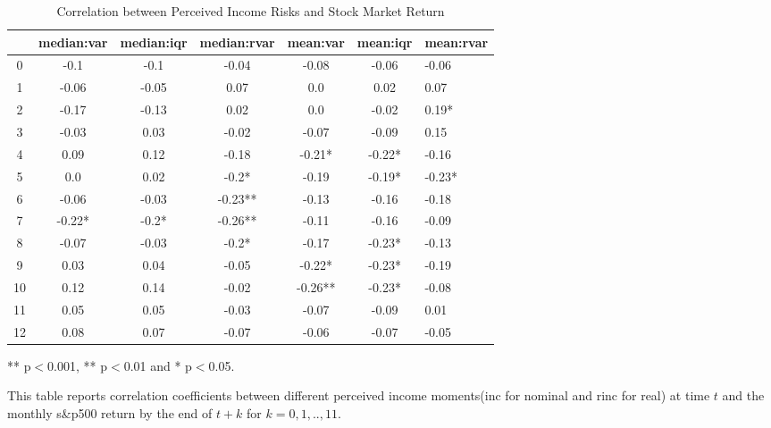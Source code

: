 
\begin{table}[ht]
\centering
\begin{adjustbox}{width={\textwidth}}
\begin{threeparttable}
\caption{Correlation between Perceived Income Risks and Stock Market Return}
\label{macro_corr}
\begin{tabular}{ccccccl}
\toprule
{} & median:var & median:iqr & median:rvar & mean:var & mean:iqr & mean:rvar \\
\midrule
0  &       -0.1 &       -0.1 &       -0.04 &    -0.08 &    -0.06 &     -0.06 \\
1  &      -0.06 &      -0.05 &        0.07 &      0.0 &     0.02 &      0.07 \\
2  &      -0.17 &      -0.13 &        0.02 &      0.0 &    -0.02 &     0.19* \\
3  &      -0.03 &       0.03 &       -0.02 &    -0.07 &    -0.09 &      0.15 \\
4  &       0.09 &       0.12 &       -0.18 &   -0.21* &   -0.22* &     -0.16 \\
5  &        0.0 &       0.02 &       -0.2* &    -0.19 &   -0.19* &    -0.23* \\
6  &      -0.06 &      -0.03 &     -0.23** &    -0.13 &    -0.16 &     -0.18 \\
7  &     -0.22* &      -0.2* &     -0.26** &    -0.11 &    -0.16 &     -0.09 \\
8  &      -0.07 &      -0.03 &       -0.2* &    -0.17 &   -0.23* &     -0.13 \\
9  &       0.03 &       0.04 &       -0.05 &   -0.22* &   -0.23* &     -0.19 \\
10 &       0.12 &       0.14 &       -0.02 &  -0.26** &   -0.23* &     -0.08 \\
11 &       0.05 &       0.05 &       -0.03 &    -0.07 &    -0.09 &      0.01 \\
12 &       0.08 &       0.07 &       -0.07 &    -0.06 &    -0.07 &     -0.05 \\
\bottomrule
\end{tabular}
\begin{tablenotes}
\item *** p$<$0.001, ** p$<$0.01 and * p$<$0.05.
\item This table reports correlation coefficients between different perceived income moments(inc for nominal
and rinc for real) at time
$t$ and the monthly s\&p500 return by the end of $t+k$ for $k=0,1,..,11$.
\end{tablenotes}
\end{threeparttable}
\end{adjustbox}
\end{table}